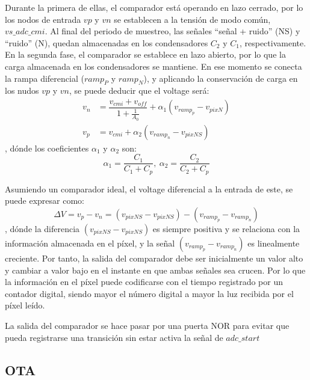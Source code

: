 Durante la primera de ellas, el comparador está operando en lazo cerrado, por lo
los nodos de entrada $vp$ y $vn$ se establecen a la tensión de modo
común, $vs\_adc\_cmi$. Al final del periodo de muestreo, las señales
``señal + ruido'' (NS) y ``ruido'' (N), quedan almacenadas en los condensadores $C_2$
y $C_1$, respectivamente.\\

En la segunda fase, el comparador se establece en lazo abierto, por lo que la carga
almacenada en los condensadores se mantiene. En ese momento se conecta la
rampa diferencial ($ramp_P$ y $ramp_N$), y aplicando la conservación de carga en los
nudos $vp$ y $vn$, se puede deducir que el voltage será:\\

\begin{align}
	v_n &= \dfrac{v_{cmi} + v_{off}}{1+\frac{1}{A_0}} + \alpha_1 (v_{ramp_p}-v_{pixN})\\
	v_p &= v_{cmi} + \alpha_2 (v_{ramp_n}-v_{pixNS})
\end{align}
, dónde los coeficientes $\alpha_1$ y $\alpha_2$ son:\\

\begin{equation}
	\alpha_1 = \dfrac{C_1}{C_1+C_p},~
	\alpha_2 = \dfrac{C_2}{C_2+C_p}
\end{equation}

Asumiendo un comparador ideal, el voltage diferencial a la entrada de este, se
puede expresar como:\\

\begin{equation}
	\Delta V= v_p - v_n = (v_{pixNS}-v_{pixNS}) - (v_{ramp_p}-v_{ramp_n})
\end{equation}
, dónde la diferencia $(v_{pixNS}-v_{pixNS})$ es siempre positiva y se relaciona
con la información almacenada en el píxel, y la señal $(v_{ramp_p}-v_{ramp_n})$ es
linealmente creciente. Por tanto, la salida del comparador debe ser inicialmente
un valor alto y cambiar a valor bajo en el instante en que ambas señales sea crucen.
Por lo que la información en el píxel puede codificarse con el tiempo registrado
por un contador digital, siendo mayor el número digital a mayor la luz recibida
por el píxel leído.

La salida del comparador se hace pasar por una puerta NOR para evitar que pueda
registrarse una transición sin estar activa la señal de $adc\_start$\\

\subsection{OTA}\label{cap:ro_sch_ota}

